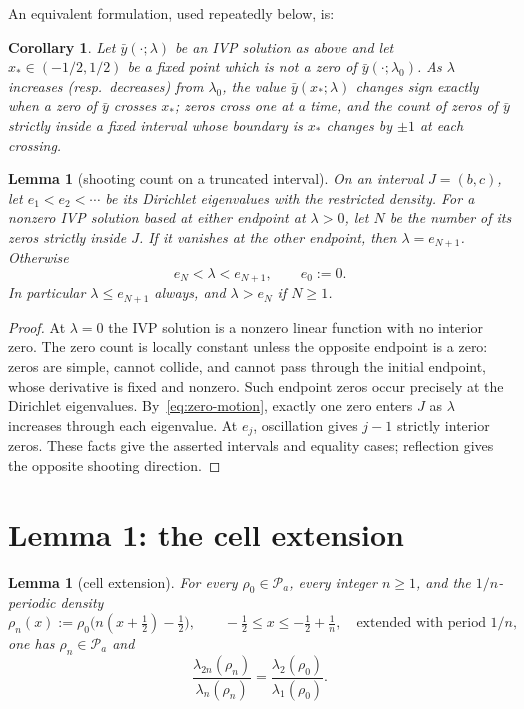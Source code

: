 ﻿\documentclass[11pt]{article}
\newtheorem{lemma}[theorem]{Lemma}
\newtheorem{corollary}[theorem]{Corollary}
\begin{document}
\noindent An equivalent formulation, used repeatedly below, is:

\begin{corollary}\label{cor:crossing}
	Let $\bar y(\cdot;\lambda)$ be an IVP solution as above and let
	$x_*\in(-1/2,1/2)$ be a fixed point which is not a zero of
	$\bar y(\cdot;\lambda_0)$.  As $\lambda$ increases (resp.\ decreases)
	from $\lambda_0$, the value $\bar y(x_*;\lambda)$ changes sign exactly
	when a zero of $\bar y$ crosses $x_*$; zeros cross one at a time, and
	the count of zeros of $\bar y$ strictly inside a fixed interval whose
	boundary is $x_*$ changes by $\pm 1$ at each crossing.
\end{corollary}

\begin{lemma}[shooting count on a truncated interval]\label{lem:count}
 On an interval $J=(b,c)$, let $e_1<e_2<\cdots$ be its Dirichlet
 eigenvalues with the restricted density. For a nonzero IVP solution
 based at either endpoint at $\lambda>0$, let $N$ be the number of its
 zeros strictly inside $J$. If it vanishes at the other endpoint, then
 $\lambda=e_{N+1}$. Otherwise
 \[
 e_N<\lambda<e_{N+1},\qquad e_0:=0.
 \]
 In particular $\lambda\le e_{N+1}$ always, and $\lambda>e_N$ if $N\ge1$.
\end{lemma}

\begin{proof}
 At $\lambda=0$ the IVP solution is a nonzero linear function with no
 interior zero. The zero count is locally constant unless the opposite
 endpoint is a zero: zeros are simple, cannot collide, and cannot pass
 through the initial endpoint, whose derivative is fixed and nonzero.
 Such endpoint zeros occur precisely at the Dirichlet eigenvalues.
 By~\eqref{eq:zero-motion}, exactly one zero enters $J$ as $\lambda$
 increases through each eigenvalue. At $e_j$, oscillation gives $j-1$
 strictly interior zeros. These facts give the asserted intervals and
 equality cases; reflection gives the opposite shooting direction.
\end{proof}

\section{Lemma 1: the cell extension}\label{sec:lemma1}

\begin{lemma}[cell extension]\label{lem:cell}
	For every $\rho_0\in\mathcal P_a$, every integer $n\ge 1$, and the
	$1/n$-periodic density
	\begin{equation*}
		\rho_n(x):=\rho_0\bigl(n(x+\tfrac12)-\tfrac12\bigr),
		\qquad -\tfrac12\le x\le -\tfrac12+\tfrac1n,
		\quad\text{extended with period }1/n,
	\end{equation*}
	one has $\rho_n\in\mathcal P_a$ and
	\begin{equation}
		\frac{\lambda_{2n}(\rho_n)}{\lambda_n(\rho_n)}
		=\frac{\lambda_2(\rho_0)}{\lambda_1(\rho_0)}.
		\label{eq:cellidentity}
	\end{equation}
\end{lemma}
\end{document}
